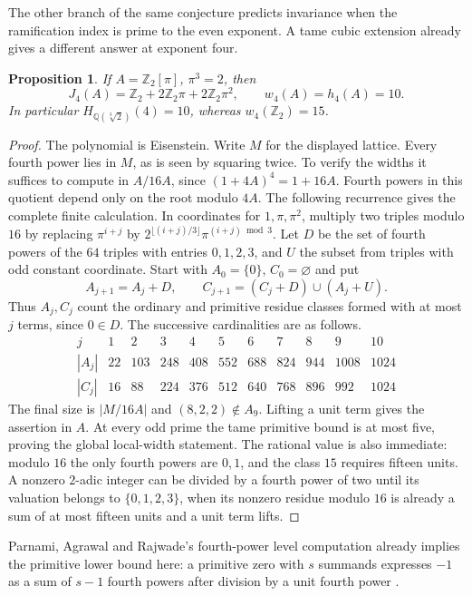 \documentclass[11pt,letterpaper]{article}
\newtheorem{proposition}[proposition]{Proposition}
\theoremstyle{definition}
\numberwithin{equation}{section}
\begin{document}
The other branch of the same conjecture predicts invariance when the
ramification index is prime to the even exponent. A tame cubic extension
already gives a different answer at exponent four.
\begin{proposition}\label{prop:tame-four-ten}
If $A=\mathbb Z_2[\pi]$, $\pi^3=2$, then
\[
 J_4(A)=\mathbb Z_2+2\mathbb Z_2\pi+2\mathbb Z_2\pi^2,
 \qquad w_4(A)=h_4(A)=10 .
\]
In particular $H_{\mathbb Q(\sqrt[3]{2})}(4)=10$, whereas
$w_4(\mathbb Z_2)=15$.
\end{proposition}
\begin{proof}
The polynomial is Eisenstein. Write $M$ for the displayed lattice.
Every fourth power lies in $M$, as is seen by squaring twice.
To verify the widths it suffices to compute in $A/16A$,
since $(1+4A)^4=1+16A$. Fourth powers in this quotient depend only on
the root modulo $4A$. The following recurrence gives the complete
finite calculation. In coordinates for $1,\pi,\pi^2$, multiply two
triples modulo $16$ by replacing $\pi^{i+j}$ by
$2^{\lfloor(i+j)/3\rfloor}\pi^{(i+j)\bmod3}$. Let $D$ be the set
of fourth powers of the $64$ triples with entries $0,1,2,3$, and $U$
the subset from triples with odd constant coordinate. Start with
$A_0=\{0\}$, $C_0=\varnothing$ and put
\[
        A_{j+1}=A_j+D,\qquad
        C_{j+1}=(C_j+D)\cup(A_j+U).
\]
Thus $A_j,C_j$ count the ordinary and primitive residue classes formed
with at most $j$ terms, since $0\in D$. The successive cardinalities
are as follows.
\[
\begin{array}{c|rrrrrrrrrr}
 j&1&2&3&4&5&6&7&8&9&10\\\hline
 |A_j|&22&103&248&408&552&688&824&944&1008&1024\\
 |C_j|&16&88&224&376&512&640&768&896&992&1024
\end{array}
\]
The final size is $|M/16A|$ and $(8,2,2)\notin A_9$. Lifting a
unit term gives the assertion in $A$. At every odd prime the tame
primitive bound is at most five, proving the global local-width
statement. The rational value is also immediate: modulo $16$ the
only fourth powers are $0,1$, and the class $15$ requires fifteen
units. A nonzero $2$-adic integer can be divided by a fourth power of
two until its valuation belongs to $\{0,1,2,3\}$, when its nonzero
residue modulo $16$ is already a sum of at most fifteen units and
a unit term lifts.
\end{proof}
Parnami, Agrawal and Rajwade's fourth-power level computation already
implies the primitive lower bound here: a primitive zero with $s$
summands expresses $-1$ as a sum of $s-1$ fourth powers after division
by a unit fourth power \cite{ParnamiFourth,ChomiczFourth}.
\end{document}
